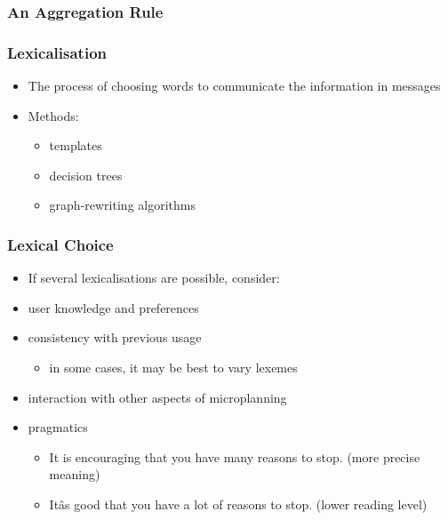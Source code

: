 \documentclass[compress,color=usenames]{beamer}
\begin{document}
\begin{frame}
\frametitle{An Aggregation Rule}

\label{f216}
 
\end{frame}

\begin{frame}
\frametitle{Lexicalisation}

\label{f218}
\begin{itemize}
\item { {The process of choosing words to communicate the information in messages}}
\item { {Methods:}}
\begin{itemize}
\item templates
\item decision trees
\item graph-rewriting algorithms
\end{itemize}
\end{itemize}
\end{frame}


\begin{frame}
\frametitle{
Lexical Choice}

\label{f0}
\begin{itemize}
\item {{If several lexicalisations are possible, consider:}}
\item {{user knowledge and preferences}}
\item {{consistency with previous usage}}
\begin{itemize}
\item in some cases, it may be best to vary lexemes
\end{itemize}
\item {{interaction with other aspects of microplanning}}
\item {{pragmatics}}
\begin{itemize}
\item It is encouraging that you have many reasons to stop.        (more precise meaning)
\item It\^as good that you have a lot of reasons to stop.                 (lower reading level)
\end{itemize}
\end{itemize}

\end{frame}
\end{document}
